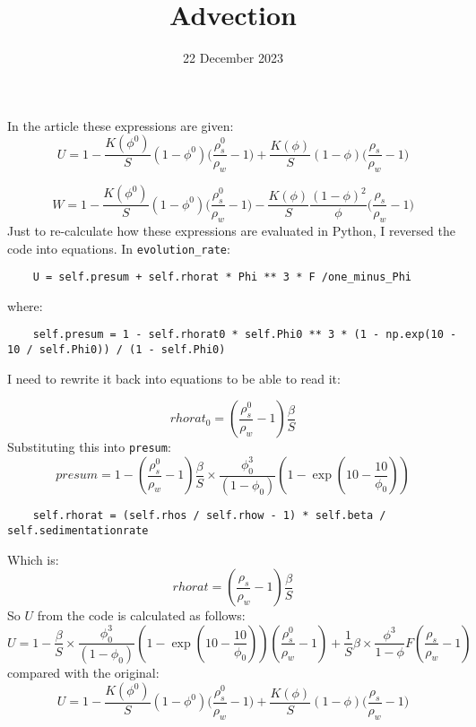 \documentclass[11pt, letterpaper]{article}
\title{Advection}
\date{22 December 2023}
\begin{document}
\maketitle

In the article these expressions are given:
\begin{equation}
    U = 1 - \frac{K(\phi^0)}{S}(1-\phi^0)\big(\frac{\rho_s^0}{\rho_w} - 1 \big) + \frac{K(\phi)}{S}(1-\phi) \big(\frac{\rho_s}{\rho_w}-1\big)
\end{equation}

\begin{equation}
    W = 1 - \frac{K(\phi^0)}{S}(1-\phi^0) \big(\frac{\rho_s^0}{\rho_w}-1) - \frac{K(\phi)}{S} \frac{(1-\phi)^2}{\phi}\big(\frac{\rho_s}{\rho_w}-1\big)
\end{equation}
Just to re-calculate how these expressions are evaluated in Python, I reversed the code into equations.
In \verb|evolution_rate|:
\begin{verbatim}
    U = self.presum + self.rhorat * Phi ** 3 * F /one_minus_Phi
\end{verbatim}
where:
\begin{verbatim}
    self.presum = 1 - self.rhorat0 * self.Phi0 ** 3 * (1 - np.exp(10 - 10 / self.Phi0)) / (1 - self.Phi0)     
\end{verbatim}

I need to rewrite it back into equations to be able to read it:

\begin{equation}
    rhorat_0 = (\frac{\rho_s^0}{\rho_w} - 1) \frac{\beta}{S}
\end{equation}
Substituting this into \verb|presum|:
\begin{equation}
    presum = 1 - (\frac{\rho_s^0}{\rho_w} - 1) \frac{\beta}{S} \times \frac{\phi_0^3}{(1 - \phi_0)} \left(1 - \exp\left(10 - \frac{10}{\phi_0} \right) \right)  
\end{equation}
\begin{verbatim}
    self.rhorat = (self.rhos / self.rhow - 1) * self.beta / self.sedimentationrate
\end{verbatim}
Which is:
\begin{equation}
    rhorat = (\frac{\rho_s}{\rho_w} - 1)\frac{\beta}{S}
\end{equation}
So $U$ from the code is calculated as follows:
\begin{equation}
    U = 1 - \frac{\beta}{S} \times \frac{\phi_0^3}{(1 - \phi_0)} \left(1 - \exp\left(10 - \frac{10}{\phi_0} \right) \right)(\frac{\rho_s^0}{\rho_w} - 1) + \frac{1}{S}\beta \times\frac{\phi^3}{1-\phi} F (\frac{\rho_s}{\rho_w} - 1)
\end{equation}
compared with the original:
\begin{equation}
    U = 1 - \frac{K(\phi^0)}{S}(1-\phi^0)\big(\frac{\rho_s^0}{\rho_w} - 1 \big) + \frac{K(\phi)}{S}(1-\phi) \big(\frac{\rho_s}{\rho_w}-1\big)
\end{equation}
\end{document}

